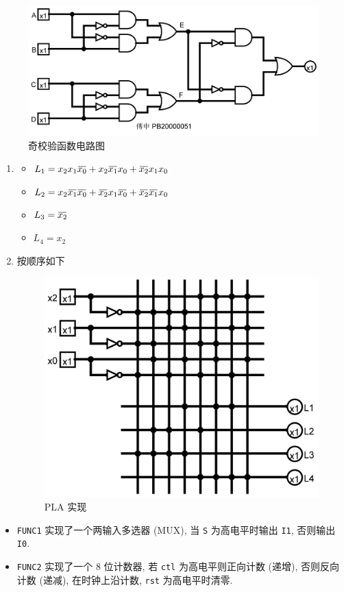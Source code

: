 \documentclass[11pt]{homework}
\newcommand{\overbar}[1]{\mkern 1.5mu\overline{\mkern-1.5mu#1\mkern-1.5mu}\mkern 1.5mu}
\begin{document}
\begin{figure}[!htbp]
    \centering
    \includegraphics[width=.6\textwidth]{images/fig_1.png}
    \caption{奇校验函数电路图}
\end{figure}
\question
\begin{enumerate}[label = \alph*)]
    \item 
    \begin{itemize}
        \item $L_1=x_2x_1\overbar{x_0}+x_2\overbar{x_1}x_0+\overbar{x_2}x_1x_0$
        \item $L_2=x_2\overbar{x_1}\overbar{x_0}+\overbar{x_2}x_1\overbar{x_0}+\overbar{x_2}\overbar{x_1}x_0$
        \item $L_3=\overbar{x_2}$
        \item $L_4=x_2$
    \end{itemize}
    \item 按顺序如下
    \begin{figure}[!htbp]
        \centering
        \includegraphics[width = .6\textwidth]{images/fig_2.png}
        \caption{PLA 实现}
    \end{figure}

\end{enumerate}
\question
\begin{itemize}
    \item \texttt{FUNC1} 实现了一个两输入多选器 (MUX), 当 \texttt{S} 为高电平时输出 \texttt{I1}, 否则输出 \texttt{I0}.
    \item \texttt{FUNC2} 实现了一个 8 位计数器, 若 \texttt{ctl} 为高电平则正向计数 (递增), 否则反向计数 (递减), 在时钟上沿计数, \texttt{rst} 为高电平时清零.
\end{itemize}
\end{document}
